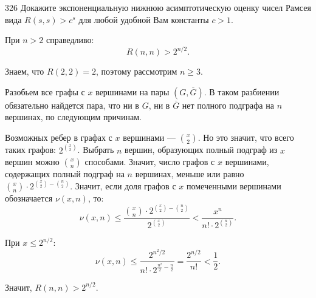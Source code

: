\begin{task}{326}
Докажите экспоненциальную нижнюю асимптотическую оценку чисел Рамсея вида $R(s,s)>c^s$ для любой удобной Вам константы $c>1$.
\end{task}

\begin{solution}

При $n > 2$ справедливо:
\begin{equation*}
    R(n, n) > 2^{n/2}.
\end{equation*}\par
Знаем, что $R(2, 2) = 2$, поэтому рассмотрим $n \geq 3$.\par
Разобьем все графы с $x$ вершинами на пары $\left(G, \overline{G} \right)$. В таком разбиении обязательно найдется пара, что ни в $G$, ни в $\overline{G}$ нет полного подграфа на $n$ вершинах, по следующим причинам.\par
Возможных ребер в графах с $x$ вершинами --- $\binom{x}{2}$. Но это значит, что всего таких графов: $2^{\binom{x}{2}}$. Выбрать $n$ вершин, образующих полный подграф из $x$ вершин можно $\binom{x}{n}$ способами. Значит, число графов с $x$ вершинами, содержащих полный подграф на $n$ вершинах, меньше или равно ${\binom{x}{n}}\cdot2^{{\binom{x}{2}} - {\binom{n}{2}}}$. Значит, если доля графов с $x$ помеченными вершинами обозначается $\nu(x, n)$, то:
\begin{equation*}
    \nu(x, n) \leq \frac{{\binom{x}{n}}\cdot2^{{\binom{x}{2}} - {\binom{n}{2}}}}{2^{\binom{x}{2}}} < \frac{x^n}{n!\cdot2^{\binom{n}{2}}}.
\end{equation*}\par
При $x \leq 2^{n/2}$:
\begin{equation*}
    \nu(x,n) \leq \frac{2^{n^2/2}}{n!\cdot2^{\frac{n^2}{2} - \frac{n}{2}}} = \frac{2^{n/2}}{n!} < \frac{1}{2}.
\end{equation*} \par
Значит, $R(n, n) > 2^{n/2}$.



\end{solution}